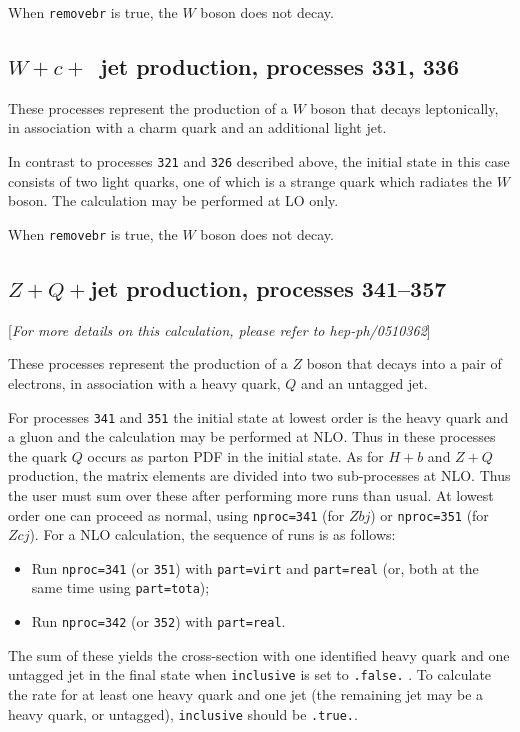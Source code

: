 \documentclass[12pt]{article}
\begin{document}
When {\tt removebr} is true, the $W$ boson does not decay.

\subsection{$W+c+$~jet production, processes 331, 336}
\label{subsec:wcj}

These processes represent the production of a $W$
boson that decays leptonically,
in association with a charm quark and an additional light jet. 

In contrast to processes {\tt 321} and {\tt 326} described above, the initial
state in this case consists of two light quarks, one of which is a
strange quark which radiates the $W$ boson. The calculation may
be performed at LO only.

When {\tt removebr} is true, the $W$ boson does not decay.

\subsection{$Z+Q+$jet production, processes 341--357}
\label{subsec:ZQj}

\begin{center}
[{\it For more details on this calculation, please refer to hep-ph/0510362}]
\end{center}

These processes represent the production of a $Z$
boson that decays into a pair of electrons,
in association with a heavy quark, $Q$ and an untagged jet.

For processes {\tt 341} and {\tt 351} the initial state at lowest
order is the heavy quark and a gluon and the calculation may be
performed at NLO.  Thus in these processes the quark $Q$ occurs as
parton PDF in the initial state.  As for $H+b$ and $Z+Q$ production,
the matrix elements are divided into two sub-processes at NLO. Thus
the user must sum over these after performing more runs than usual. At
lowest order one can proceed as normal, using {\tt nproc=341} (for
$Zbj$) or {\tt nproc=351} (for $Zcj$).  For a NLO calculation, the
sequence of runs is as follows:
\begin{itemize}
\item Run {\tt nproc=341} (or {\tt 351}) with {\tt part=virt} and
{\tt part=real} (or, both at the same time using {\tt part=tota});
\item Run {\tt nproc=342} (or {\tt 352}) with {\tt part=real}.
\end{itemize}
The sum of these yields the cross-section with one identified heavy
quark and one untagged jet in the final state when {\tt inclusive} is
set to {\tt .false.} . To calculate the rate for at least one heavy
quark and one jet (the remaining jet may be a heavy quark, or
untagged), {\tt inclusive} should be {\tt .true.}.
\end{document}
